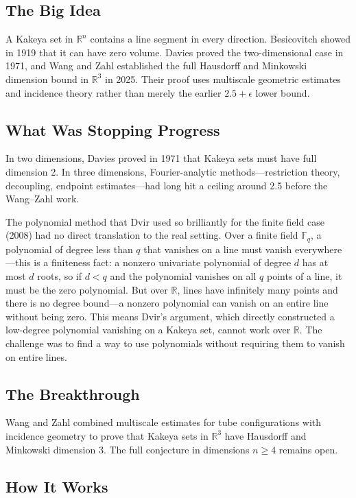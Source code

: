 \subsection{The Big Idea}
A Kakeya set in $\mathbb{R}^n$ contains a line segment in every direction. Besicovitch showed in 1919 that it can have zero volume. Davies proved the two-dimensional case in 1971, and Wang and Zahl established the full Hausdorff and Minkowski dimension bound in $\mathbb{R}^3$ in 2025. Their proof uses multiscale geometric estimates and incidence theory rather than merely the earlier $2.5+\epsilon$ lower bound.

\subsection{What Was Stopping Progress}
In two dimensions, Davies proved in 1971 that Kakeya sets must have full dimension 2. In three dimensions, Fourier-analytic methods---restriction theory, decoupling, endpoint estimates---had long hit a ceiling around 2.5 before the Wang--Zahl work.

The polynomial method that Dvir used so brilliantly for the finite field case (2008) had no direct translation to the real setting. Over a finite field $\mathbb{F}_q$, a polynomial of degree less than $q$ that vanishes on a line must vanish everywhere---this is a finiteness fact: a nonzero univariate polynomial of degree $d$ has at most $d$ roots, so if $d < q$ and the polynomial vanishes on all $q$ points of a line, it must be the zero polynomial. But over $\mathbb{R}$, lines have infinitely many points and there is no degree bound---a nonzero polynomial can vanish on an entire line without being zero. This means Dvir's argument, which directly constructed a low-degree polynomial vanishing on a Kakeya set, cannot work over $\mathbb{R}$. The challenge was to find a way to use polynomials without requiring them to vanish on entire lines.

\subsection{The Breakthrough}
Wang and Zahl combined multiscale estimates for tube configurations with incidence geometry to prove that Kakeya sets in $\mathbb{R}^3$ have Hausdorff and Minkowski dimension 3. The full conjecture in dimensions $n\geq4$ remains open.

\subsection{How It Works}

